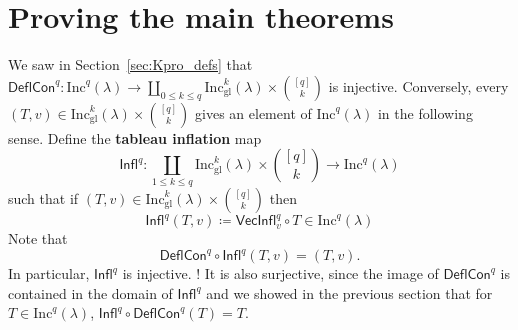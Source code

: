 \documentclass[12pt]{amsart}
\theoremstyle{definition}
\theoremstyle{remark}
\numberwithin{equation}{section}
\newcommand{\inc}{\ensuremath{\mathrm{Inc}}}
\newcommand{\incgl}{\inc_{\mathrm{gl}}}
\newcommand{\deflate}{\ensuremath{\mathsf{Defl}}}
\newcommand{\inflate}{\ensuremath{\mathsf{VecInfl}}}
\newcommand{\tinflate}{\ensuremath{\mathsf{Infl}}}
\newcommand{\content}{\ensuremath{\mathsf{Con}}}
\newcommand{\compress}{\ensuremath{\mathsf{DeflCon}}}
\begin{document}
\section{Proving the main theorems}\label{sec:arithmetic}
%

We saw in Section~\ref{sec:Kpro_defs} that $\compress^q : \inc^q(\lambda) \to \coprod_{0 \leq k \leq q} \incgl^k(\lambda) \times \binom{[q]}{k}$ is injective. Conversely, every $(T,v) \in \incgl^k(\lambda) \times \binom{[q]}{k}$ gives an element of $\inc^q(\lambda)$ in the following sense. Define the {\bf tableau inflation} map  \[ \tinflate^q: \coprod_{1 \leq k \leq q}  \incgl^k(\lambda) \times  \binom{[q]}{k}  \rightarrow  \inc^q(\lambda) \] such that if $(T,v) \in \incgl^k(\lambda) \times \binom{[q]}{k}$ then
\[ \tinflate^q(T,v) \coloneqq \inflate^q_v \circ T \in \inc^q(\lambda)  \]  
Note that
\[ \compress^q \circ \tinflate^q(T,v) = (T,v). \] In particular, $\tinflate^q$ is injective. ! It is also surjective, since the image of $\compress^q$ is contained in the domain of $\tinflate^q$ and we showed in the previous section that for $T \in \inc^q(\lambda)$, $\tinflate^q \circ \compress^q(T) = T$. 
\end{document}
